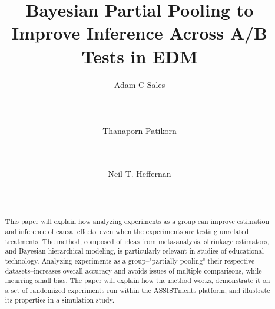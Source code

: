 \documentclass{edm_template}
\begin{document}
\title{Bayesian Partial Pooling to Improve Inference Across A/B Tests in EDM}

\author{
\alignauthor Adam C Sales\\
       \\
       \\
       \\
\alignauthor Thanaporn Patikorn\\
       \\
       \\
\and  %
\alignauthor Neil T. Heffernan\\
       \\
       \\
}

\maketitle
\begin{abstract}
This paper will explain how analyzing experiments as a group can improve estimation and inference of causal effects--even when the experiments are testing unrelated treatments. The method, composed of ideas from meta-analysis, shrinkage estimators, and Bayesian hierarchical modeling, is particularly relevant in studies of educational technology. Analyzing experiments as a group--"partially pooling" their respective datasets--increases overall accuracy and avoids issues of multiple comparisons, while incurring small bias. The paper will explain how the method works, demonstrate it on a set of randomized experiments run within the ASSISTments platform, and illustrate its properties in a simulation study.
% 
% 
\end{abstract}
\end{document}
